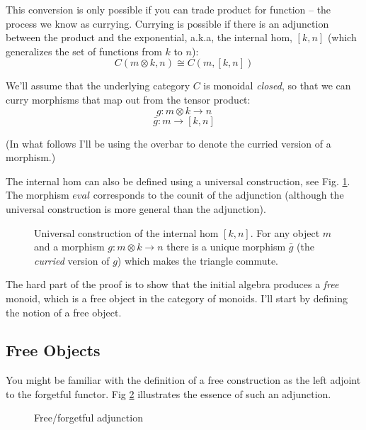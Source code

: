 \documentclass[letterpaper, 10 pt, conference]{ieeeconf}
\begin{document}
This conversion is only possible if you can trade product for function -- the process we know as currying. Currying is possible if there is an adjunction between the product and the exponential, a.k.a, the internal hom, $[k, n]$ (which generalizes the set of functions from $k$ to $n$):
\[C(m \otimes k, n) \cong C(m, [k, n])\]

We'll assume that the underlying category $C$ is monoidal \textit{closed}, so that we can curry morphisms that map out from the tensor product: 
\[g \colon m \otimes k \to n\]
\[\bar{g} \colon m \to [k, n]\]

(In what follows I'll be using the overbar to denote the curried version of a morphism.) 

The internal hom can also be defined using a universal construction, see Fig. \ref{fig-uhom}. The morphism $eval$ corresponds to the counit of the adjunction (although the universal construction is more general than the adjunction).

\begin{figure}[h]
\centering
{}
\caption{Universal construction of the internal hom $[k, n]$. For any object $m$ and a morphism $g \colon m \otimes k \to n$ there is a unique morphism $\bar{g}$ (the \textit{curried} version of $g$) which makes the triangle commute.}
\label{fig-uhom}
\end{figure}


The hard part of the proof is to show that the initial algebra produces a \textit{free} monoid, which is a free object in the category of monoids. I'll start by defining the notion of a free object.

\subsection{Free Objects}

You might be familiar with the definition of a free construction as the left adjoint to the forgetful functor. Fig \ref{fig-ffadj} illustrates the essence of such an adjunction. 

\begin{figure}[h]
\centering
{}
\caption{Free/forgetful adjunction}
\label{fig-ffadj}
\end{figure}
\end{document}
